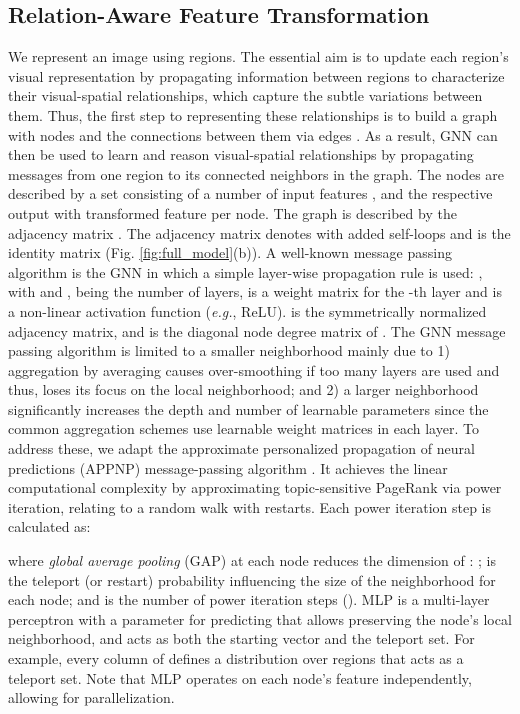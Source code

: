 \documentclass[journal]{IEEEtran}
\begin{document}
\subsection{Relation-Aware Feature Transformation}\label{sec:feat}
We represent an image  using   regions. The essential aim is to update each region's visual representation  by propagating information between regions to characterize their visual-spatial relationships, which capture the subtle variations between them. Thus, the first step to representing these relationships is to build a graph  with nodes  and the connections between them via edges . As a result, GNN can then be used to learn and reason visual-spatial relationships by propagating messages from one region to its connected neighbors in the graph. The nodes are described by a set  consisting of a number   of input features , and the respective output  with transformed feature  per node. The graph  is described by the adjacency matrix . The adjacency matrix  denotes  with added self-loops and  is the identity matrix (Fig. \ref{fig:full_model}(b)). A well-known message passing algorithm is the GNN \cite{kipf2016semi} in which a simple layer-wise propagation rule is used: , with  and ,  being the number of layers,  is a weight matrix for the -th layer and  is a non-linear activation function (\textit{e.g.}, ReLU).  is the symmetrically normalized adjacency matrix, and  is the diagonal node degree matrix of . The GNN message passing algorithm is limited to a smaller neighborhood mainly due to 1) aggregation by averaging causes over-smoothing if too many layers are used and thus, loses its focus on the local neighborhood; and 2) a larger neighborhood significantly increases the depth and number of learnable parameters since the common aggregation schemes use learnable weight matrices in each layer. To address these, we adapt the approximate personalized propagation of neural predictions (APPNP) message-passing algorithm \cite{klicpera2018predict}. It achieves the linear computational complexity by approximating topic-sensitive PageRank via power iteration, relating to a random walk with restarts. Each power iteration step is calculated as: \vspace{-.1cm}
 
where \textit{global average pooling} (GAP) at each node reduces the dimension of : ;  is the teleport (or restart) probability influencing the size of the neighborhood for each node; and  is the number of power iteration steps (). MLP is a multi-layer perceptron with a parameter  for predicting  that allows preserving the node’s local neighborhood, and acts as both the starting vector and the teleport set. For example, every column of  defines a distribution over regions that acts as a teleport set. Note that MLP operates on each node’s feature  independently, allowing for parallelization. 
\end{document}
